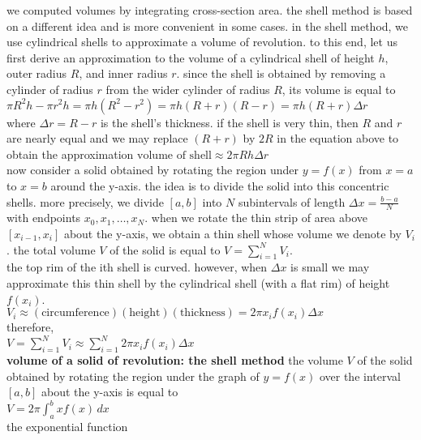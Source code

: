 \documentclass{article}
\begin{document}
we computed volumes by integrating cross-section area. the shell method is based on a different idea and is more convenient in some cases. in the shell method, we use cylindrical shells to approximate a volume of revolution. to this end, let us first derive an approximation to the volume of a cylindrical shell of height $h$, outer radius $R$, and inner radius $r$. since the shell is obtained by removing a cylinder of radius $r$ from the wider cylinder of radius $R$, its volume is equal to\\ $\pi R^2h - \pi r^2h = \pi h(R^2 - r^2) = \pi h(R + r)(R - r) = \pi h(R + r)\Delta r$\\ where $\Delta r = R - r$ is the shell's thickness. if the shell is very thin, then $R$ and $r$ are nearly equal and we may replace $(R + r)$ by $2R$ in the equation above to obtain the approximation $\text{volume of shell} \approx 2\pi Rh\Delta r$\\

now consider a solid obtained by rotating the region under $y = f(x)$ from $x = a$ to $x = b$ around the y-axis. the idea is to divide the solid into this concentric shells. more precisely, we divide $[a, b]$ into $N$ subintervals of length $\Delta x = \frac{b - a}{N}$ with endpoints $x_0, x_1, \ldots, x_N$. when we rotate the thin strip of area above $[x_{i - 1}, x_i]$ about the y-axis, we obtain a thin shell whose volume we denote by $V_i$. the total volume $V$ of the solid is equal to $V = \sum_{i=1}^{N}V_i$.\\

the top rim of the ith shell is curved. however, when $\Delta x$ is small we may approximate this thin shell by the cylindrical shell (with a flat rim) of height $f(x_i)$.\\ $V_i \approx (\text{circumference})(\text{height})(\text{thickness}) = 2\pi x_if(x_i)\Delta x$\\ therefore,\\ $V = \sum_{i=1}^{N}V_i \approx \sum_{i=1}^{N}2\pi x_if(x_i)\Delta x$\\

\textbf{volume of a solid of revolution: the shell method} the volume $V$ of the solid obtained by rotating the region under the graph of $y = f(x)$ over the interval $[a, b]$ about the y-axis is equal to\\ $V = 2\pi \int_{a}^{b}xf(x)\,dx$\\

the exponential function\\
\end{document}
